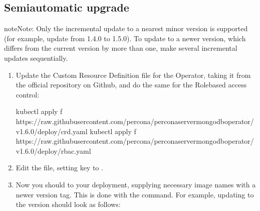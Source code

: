 \documentclass[letterpaper,10pt,english]{sphinxmanual}
\begin{document}
\subsection{Semi\sphinxhyphen{}automatic upgrade}
\label{\detokenize{update:semi-automatic-upgrade}}\label{\detokenize{update:operator-update-semi-auto-updates}}
\begin{sphinxadmonition}{note}{Note:}
Only the incremental update to a nearest minor version is supported
(for example, update from 1.4.0 to 1.5.0).
To update to a newer version, which differs from the current version by more
than one, make several incremental updates sequentially.
\end{sphinxadmonition}
\begin{enumerate}
%
\item {} 
Update the Custom Resource Definition file for the Operator, taking it from
the official repository on Github, and do the same for the Role\sphinxhyphen{}based access
control:

\begin{sphinxVerbatim}[commandchars=\\\{\}]
kubectl apply \PYGZhy{}f https://raw.githubusercontent.com/percona/percona\PYGZhy{}server\PYGZhy{}mongodb\PYGZhy{}operator/v1.6.0/deploy/crd.yaml
kubectl apply \PYGZhy{}f https://raw.githubusercontent.com/percona/percona\PYGZhy{}server\PYGZhy{}mongodb\PYGZhy{}operator/v1.6.0/deploy/rbac.yaml
\end{sphinxVerbatim}

\item {} 
Edit the  file, setting  key to
.

\item {} 
Now you should  to your
deployment, supplying necessary image names with a newer version tag. This
is done with the  command. For example, updating
to the  version should look as follows:


\end{enumerate}
\end{document}
